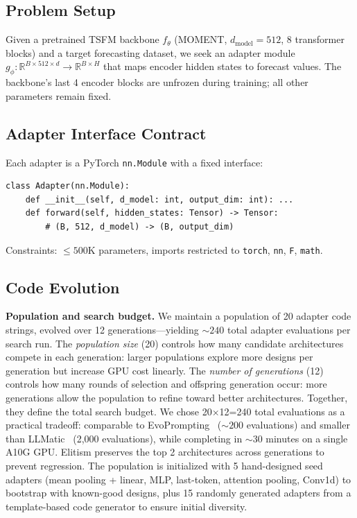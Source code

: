 \documentclass{article}
\begin{document}
\subsection{Problem Setup}

Given a pretrained TSFM backbone $f_\theta$ (MOMENT, $d_\text{model}{=}512$, 8 transformer blocks) and a target forecasting dataset, we seek an adapter module $g_\phi: \mathbb{R}^{B \times 512 \times d} \rightarrow \mathbb{R}^{B \times H}$ that maps encoder hidden states to forecast values. The backbone's last 4 encoder blocks are unfrozen during training; all other parameters remain fixed.

\subsection{Adapter Interface Contract}

Each adapter is a PyTorch \texttt{nn.Module} with a fixed interface:
\begin{verbatim}
class Adapter(nn.Module):
    def __init__(self, d_model: int, output_dim: int): ...
    def forward(self, hidden_states: Tensor) -> Tensor:
        # (B, 512, d_model) -> (B, output_dim)
\end{verbatim}
Constraints: ${\leq}500$K parameters, imports restricted to \texttt{torch}, \texttt{nn}, \texttt{F}, \texttt{math}.

\subsection{Code Evolution}

\textbf{Population and search budget.} We maintain a population of 20 adapter code strings, evolved over 12 generations---yielding ${\sim}240$ total adapter evaluations per search run. The \textit{population size} (20) controls how many candidate architectures compete in each generation: larger populations explore more designs per generation but increase GPU cost linearly. The \textit{number of generations} (12) controls how many rounds of selection and offspring generation occur: more generations allow the population to refine toward better architectures. Together, they define the total search budget. We chose 20$\times$12{=}240 total evaluations as a practical tradeoff: comparable to EvoPrompting~\cite{chen2023evoprompting} (${\sim}200$ evaluations) and smaller than LLMatic~\cite{nasir2024llmatic} (2,000 evaluations), while completing in ${\sim}30$ minutes on a single A10G GPU. Elitism preserves the top 2 architectures across generations to prevent regression. The population is initialized with 5 hand-designed seed adapters (mean pooling + linear, MLP, last-token, attention pooling, Conv1d) to bootstrap with known-good designs, plus 15 randomly generated adapters from a template-based code generator to ensure initial diversity.
\end{document}

